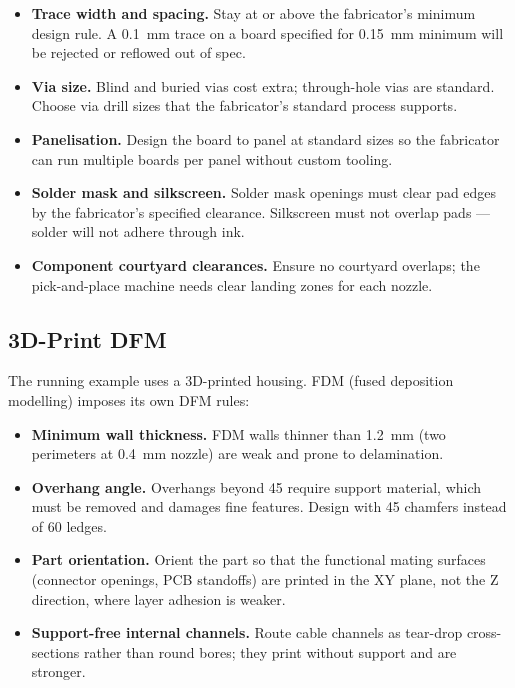 \begin{itemize}
  \item \textbf{Trace width and spacing.} Stay at or above the fabricator's
        minimum design rule.
        A 0.1~mm trace on a board specified for 0.15~mm minimum will be
        rejected or reflowed out of spec.
  \item \textbf{Via size.} Blind and buried vias cost extra; through-hole vias
        are standard.
        Choose via drill sizes that the fabricator's standard process supports.
  \item \textbf{Panelisation.} Design the board to panel at standard sizes so
        the fabricator can run multiple boards per panel without custom tooling.
  \item \textbf{Solder mask and silkscreen.} Solder mask openings must clear
        pad edges by the fabricator's specified clearance.
        Silkscreen must not overlap pads --- solder will not adhere through ink.
  \item \textbf{Component courtyard clearances.} Ensure no courtyard overlaps;
        the pick-and-place machine needs clear landing zones for each nozzle.
\end{itemize}

\subsection{3D-Print DFM}
\label{sec:ch7-dfm-3dp}

The running example uses a 3D-printed housing.
FDM (fused deposition modelling) imposes its own DFM rules:

\begin{itemize}
  \item \textbf{Minimum wall thickness.} FDM walls thinner than 1.2~mm (two
        perimeters at 0.4~mm nozzle) are weak and prone to delamination.
  \item \textbf{Overhang angle.} Overhangs beyond 45\textdegree{} require
        support material, which must be removed and damages fine features.
        Design with 45\textdegree{} chamfers instead of 60\textdegree{} ledges.
  \item \textbf{Part orientation.} Orient the part so that the functional
        mating surfaces (connector openings, PCB standoffs) are printed in the
        XY plane, not the Z direction, where layer adhesion is weaker.
  \item \textbf{Support-free internal channels.} Route cable channels as
        tear-drop cross-sections rather than round bores; they print without
        support and are stronger.
\end{itemize}

